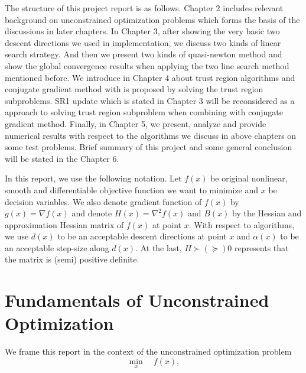 \documentclass[11pt]{report}
\begin{document}
The structure of this project report is as follows. Chapter 2 includes relevant background on unconstrained optimization problems which forms the basis of the discussions in later chapters. In Chapter 3, after showing the very basic two descent directions we used in implementation, we discuss two kinds of linear search strategy. And then we present two kinds of quasi-newton method and show the global convergence results when applying the two line search method mentioned before. We introduce in Chapter 4 about trust region algorithms and conjugate gradient method with is proposed by solving the trust region subproblems. SR1 update which is stated in Chapter 3 will be reconsidered as a approach to solving trust region subproblem when combining with conjugate gradient method. Finally, in Chapter 5, we present, analyze and provide numerical results with respect to the algorithms we discuss in above chapters on some test problems. Brief summary of this project and some general conclusion will be stated in the Chapter 6. 

In this report, we use the following notation. Let $f(x)$ be original nonlinear, smooth and differentiable objective function we want to minimize and $x$ be decision variables. We also denote gradient function of $f(x)$ by $g(x)=\nabla f(x)$ and denote $H(x)=\nabla^2 f(x)$ and $B(x)$ by the Hessian and approximation Hessian matrix of $f(x)$ at point $x$. With respect to algorithms, we use $d(x)$ to be an acceptable descent directions at point $x$ and $\alpha(x)$ to be an acceptable step-size along $d(x)$. At the last, $H\succ(\succeq) 0$ represents that the matrix is (semi) positive definite. 


\chapter{Fundamentals of Unconstrained Optimization}
We frame this report in the context of the unconstrained optimization problem
\begin{equation}
    \min_x \quad f(x),
\end{equation}
\end{document}
